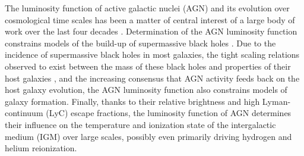 \documentclass[fleqn,usenatbib]{mnras}
\begin{document}
The luminosity function of active galactic nuclei (AGN) and its
evolution over cosmological time scales has been a matter of central
interest of a large body of work over the last four decades
\citep[e.g.,][]{1978A&A....68...17M, 1983ApJ...269..352S,
  1988ApJ...325...92K, 1988MNRAS.235..935B, 1993ApJ...406L..43H,
  1994ApJ...421..412W, 1995AJ....110...68S, 1995AJ....110.2553K,
  1995ApJ...438..623P, 2000MNRAS.317.1014B, 2001AJ....121...54F,
  2004AJ....128..515F, 2006AJ....131.2766R, 2007ApJ...654..731H,
  2009MNRAS.392...19C, 2010AJ....139..906W, 2011ApJ...728L..26G,
  2013ApJ...773...14R, 2013ApJ...768..105M, 2015AA...578A..83G,
  2015ApJ...798...28K, 2016ApJ...829...33Y, 2016ApJ...833..222J,
  2017MNRAS.466.1160M}.  Determination of the AGN luminosity function
constrains models of the build-up of supermassive black holes
\citep{2015MNRAS.452..575S, 2016MNRAS.462..190R}.  Due to the
incidence of supermassive black holes in most galaxies, the tight
scaling relations observed to exist between the mass of these black
holes and properties of their host galaxies
\citep{2013ARA&A..51..511K, 2013ApJ...764..184M}, and the increasing
consensus that AGN activity feeds back on the host galaxy evolution,
the AGN luminosity function also constrains models of galaxy
formation.  Finally, thanks to their relative brightness and high
Lyman-continuum (LyC) escape fractions, the luminosity function of AGN
determines their influence on the temperature and ionization state of
the intergalactic medium (IGM) over large scales, possibly even
primarily driving hydrogen and helium reionization.  
\end{document}
